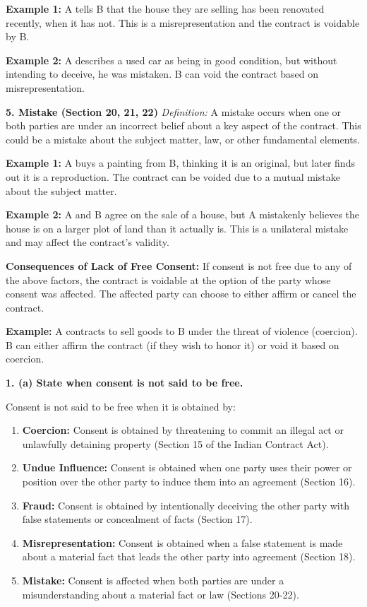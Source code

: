\documentclass[12pt,a4paper]{book}
\begin{document}
\textbf{Example 1:}  
A tells B that the house they are selling has been renovated recently, when it has not. This is a misrepresentation and the contract is voidable by B.

\textbf{Example 2:}  
A describes a used car as being in good condition, but without intending to deceive, he was mistaken. B can void the contract based on misrepresentation.

\vspace{0.5cm}
\textbf{5. Mistake (Section 20, 21, 22)}  
\textit{Definition:} A mistake occurs when one or both parties are under an incorrect belief about a key aspect of the contract. This could be a mistake about the subject matter, law, or other fundamental elements.

\textbf{Example 1:}  
A buys a painting from B, thinking it is an original, but later finds out it is a reproduction. The contract can be voided due to a mutual mistake about the subject matter.

\textbf{Example 2:}  
A and B agree on the sale of a house, but A mistakenly believes the house is on a larger plot of land than it actually is. This is a unilateral mistake and may affect the contract's validity.

\vspace{0.5cm}
\textbf{Consequences of Lack of Free Consent:}  
If consent is not free due to any of the above factors, the contract is voidable at the option of the party whose consent was affected. The affected party can choose to either affirm or cancel the contract.  

\textbf{Example:}  
A contracts to sell goods to B under the threat of violence (coercion). B can either affirm the contract (if they wish to honor it) or void it based on coercion.

\vspace{1cm}


\textbf{1. (a) State when consent is not said to be free.}  

Consent is not said to be free when it is obtained by:  
\begin{enumerate}
    \item \textbf{Coercion:} Consent is obtained by threatening to commit an illegal act or unlawfully detaining property (Section 15 of the Indian Contract Act).
    \item \textbf{Undue Influence:} Consent is obtained when one party uses their power or position over the other party to induce them into an agreement (Section 16).
    \item \textbf{Fraud:} Consent is obtained by intentionally deceiving the other party with false statements or concealment of facts (Section 17).
    \item \textbf{Misrepresentation:} Consent is obtained when a false statement is made about a material fact that leads the other party into agreement (Section 18).
    \item \textbf{Mistake:} Consent is affected when both parties are under a misunderstanding about a material fact or law (Sections 20-22).
\end{enumerate}
\end{document}
